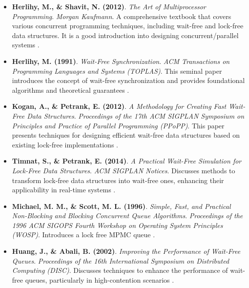\documentclass[ a4paper,
                toc=bibliography
              ]{scrartcl}
\begin{document}
\begin{itemize}
	\item \textbf{Herlihy, M., \& Shavit, N. (2012)}. \textit{The Art of Multiprocessor Programming}. \textit{Morgan Kaufmann}.
	      A comprehensive textbook that covers various concurrent programming techniques, including wait-free and lock-free data structures. It is a good introduction into designing concurrent/parallel systems \cite{herlihy2012art}.

	\item \textbf{Herlihy, M. (1991)}. \textit{Wait-Free Synchronization}. \textit{ACM Transactions on Programming Languages and Systems (TOPLAS)}.
	      This seminal paper introduces the concept of wait-free synchronization and provides foundational algorithms and theoretical guarantees \cite{herlihy1991wait}.
	
	\item \textbf{Kogan, A., \& Petrank, E. (2012)}. \textit{A Methodology for Creating Fast Wait-Free Data Structures}. \textit{Proceedings of the 17th ACM SIGPLAN Symposium on Principles and Practice of Parallel Programming (PPoPP)}.
	      This paper presents techniques for designing efficient wait-free data structures based on existing lock-free implementations \cite{kogan2012methodology}.
	
	\item \textbf{Timnat, S., \& Petrank, E. (2014)}. \textit{A Practical Wait-Free Simulation for Lock-Free Data Structures}. \textit{ACM SIGPLAN Notices}.
	      Discusses methods to transform lock-free data structures into wait-free ones, enhancing their applicability in real-time systems \cite{timnat2014practical}.
	
	\item \textbf{Michael, M. M., \& Scott, M. L. (1996)}. \textit{Simple, Fast, and Practical Non-Blocking and Blocking Concurrent Queue Algorithms}. \textit{Proceedings of the 1996 ACM SIGOPS Fourth Workshop on Operating System Principles (WOSP)}.
	      Introduces a lock free MPMC queue \cite{michael1996simple}.

	\item \textbf{Huang, J., \& Abali, B. (2002)}. \textit{Improving the Performance of Wait-Free Queues}. \textit{Proceedings of the 16th International Symposium on Distributed Computing (DISC)}.
	      Discusses techniques to enhance the performance of wait-free queues, particularly in high-contention scenarios \cite{huang2002improvingWaitFree}.
\end{itemize}
\end{document}

